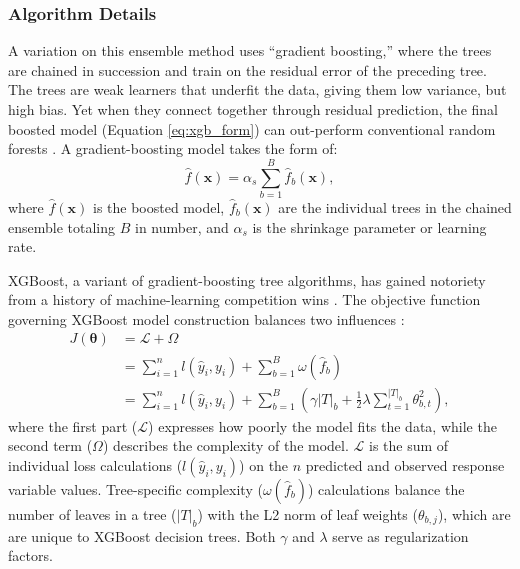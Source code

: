 \subsubsection{Algorithm Details}\label{ch3:xgb_details}

A variation on this ensemble method uses ``gradient boosting,'' where the trees are chained in succession and train on the residual error of the preceding tree. The trees are weak learners that underfit the data, giving them low variance, but high bias. Yet when they connect together through residual prediction, the final boosted model (Equation \ref{eq:xgb_form}) can out-perform conventional random forests \citep[p.\ 323]{james_introduction_2013}. A gradient-boosting model takes the form of:
\begin{equation}
\label{eq:xgb_form}
    \hat{f}(\textbf{x}) = \alpha_s\sum_{b=1}^{B} \hat{f}_{b}(\textbf{x}),
\end{equation}
where $\hat{f}(\textbf{x})$ is the boosted model, $\hat{f}_b(\textbf{x})$ are the individual trees in the chained ensemble totaling $B$ in number, and $\alpha_s$ is the shrinkage parameter or learning rate. 

XGBoost, a variant of gradient-boosting tree algorithms, has gained notoriety from a history of machine-learning competition wins \citep{chen_dmlcxgboost_2021}. The objective function governing XGBoost model construction balances two influences \citep{chen_xgboost_2016}:
\begin{equation}
\label{eq:xgb_objective}
\begin{aligned}
    J(\boldsymbol\theta) &= \mathcal{L} + \Omega \\
    &= \sum_{i=1}^{n}{l(\hat{y}_i,y_i)}+\sum_{b=1}^{B}\omega(\hat{f}_b) \\
    &= \sum_{i=1}^{n}{l(\hat{y}_i,y_i)}+\sum_{b=1}^{B}{\left({\gamma \left|T\right|_b}+\frac{1}{2} \lambda \sum_{t=1}^{\left|T\right|_b}{\theta_{b,t}^2}\right)},
\end{aligned}
\end{equation}
where the first part ($\mathcal{L}$) expresses how poorly the model fits the data, while the second term ($\Omega$) describes the complexity of the model. $\mathcal{L}$ is the sum of individual loss calculations ($l(\hat{y}_i,y_i)$) on the $n$ predicted and observed response variable values. Tree-specific complexity ($\omega(\hat{f}_b)$) calculations balance the number of leaves in a tree ($\left|T\right|_b$) with the L2 norm of leaf weights ($\theta_{b,j}$), which are are unique to XGBoost decision trees. Both $\gamma$ and $\lambda$ serve as regularization factors. 

